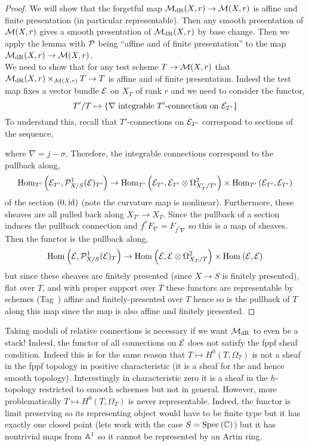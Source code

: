 \documentclass[12pt]{article}
\begin{document}
\begin{proof}
We will show that the forgetful map $\mathcal{M}_{\mathrm{dR}}(X, r) \to \mathcal{M}(X, r)$ is affine and finite presentation (in particular representable). Then any smooth presentation of $\mathcal{M}(X,r)$ gives a smooth presentation of $\mathcal{M}_{\mathrm{dR}}(X, r)$ by base change. Then we apply the lemma with $\mathcal{P}$ being ``affine and of finite presentation'' to the map $\mathcal{M}_{\mathrm{dR}}(X, r) \to \mathcal{M}(X, r)$. 
\bigskip\\
We need to show that for any test scheme $T \to \mathcal{M}(X, r)$ that $\mathcal{M}_{\mathrm{dR}}(X, r) \times_{\mathcal{M}(X, r)} T \to T$ is affine and of finite presentation. Indeed the test map fixes a vector bundle $\mathcal{E}$ on $X_T$ of rank $r$ and we need to consider the functor,
\[ T'/T \mapsto \{ \nabla \text{ integrable } T'\text{-connection on } \mathcal{E}_{T'} \} \]
To understand this, recall that $T'$-connections on $\mathcal{E}_{T'}$ correspond to sections of the sequence,
\begin{center}
\end{center}
where $\nabla = j - \sigma$. Therefore, the integrable connections correspond to the pullback along,
\[ \mathrm{Hom}_{T'} \left( \mathcal{E}_{T'}, \mathcal{P}^1_{X/S}(\mathcal{E})_{T'} \right) \to \mathrm{Hom}_{T'} \left( \mathcal{E}_{T'}, \mathcal{E}_{T'} \otimes \Omega^2_{X'_T/T'} \right) \times \mathrm{Hom}_{T'} \left( \mathcal{E}_{T'}, \mathcal{E}_{T'} \right) \]
of the section $(0, \mathrm{id})$ (note the curvature map is nonlinear). Furthermore, these sheaves are all pulled back along $X_{T'} \to X_T$. Since the pullback of a section induces the pullback connection and $f^* F_{\nabla} = F_{f^* \nabla}$ so this is a map of sheaves. Then the functor is the pullback along,
\[ \mathrm{Hom}_{} \left( \mathcal{E}, \mathcal{P}^1_{X/S}(\mathcal{E})_{T} \right) \to \mathrm{Hom}_{} \left( \mathcal{E}, \mathcal{E} \otimes \Omega^2_{X_T/T} \right) \times \mathrm{Hom}_{} \left( \mathcal{E}, \mathcal{E} \right) \]
but since these sheaves are finitely presented (since $X \to S$ is finitely presented), flat over $T$, and with proper support over $T$ these functors are representable by schemes (Tag~) affine and finitely-presented over $T$ hence so is the pullback of $T$ along this map since the map is also affine and finitely presented.
\end{proof}

\begin{rmk}
Taking moduli of relative connections is necessary if we want $\mathcal{M}_{\mathrm{dR}}$ to even be a stack! Indeed, the functor of all connections on $\mathcal{E}$ does not satisfy the fppf sheaf condition. Indeed this is for the same reason that $T \mapsto H^0(T, \Omega_T)$ is not a sheaf in the fppf topology in positive characteristic (it is a sheaf for the \etale and hence smooth topology). Interestingly in characteristic zero it is a sheaf in the $h$-topology restricted to smooth scheemes but not in general. However, more problematically $T \mapsto H^0(T, \Omega_T)$ is never representable. Indeed, the functor is limit preserving so its representing object would have to be finite type but it has exactly one closed point (lets work with the case $S = \mathrm{Spec}\left( \mathbb{C} \right)$) but it has nontrivial maps from $\mathbb{A}^1$ so it cannot be represented by an Artin ring. 
\end{rmk}
\end{document}
